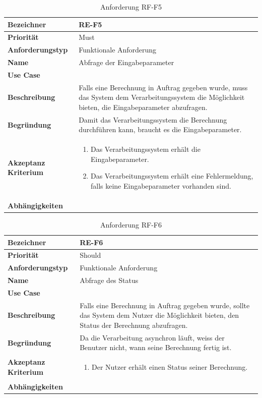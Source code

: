 \begin{table}[ht]
\centering
  \begin{tabular}{ l | p{8cm} }
	\hline
	\rowcolor{gray}
	\textbf{Bezeichner}&	\textbf{RE-F5}\\ \hline
	\textbf{Priorität} 		&	Must\\ \hline
	\textbf{Anforderungstyp}	&	Funktionale Anforderung\\ \hline
	\textbf{Name} 			&	Abfrage der Eingabeparameter\\ \hline
	\textbf{Use Case} 		&	\nameref{table:use_case_3}\\ \hline
	\textbf{Beschreibung} 	&	Falls eine Berechnung in Auftrag gegeben wurde, muss das System dem Verarbeitungssystem die Möglichkeit bieten, die Eingabeparameter abzufragen.\\ \hline
	\textbf{Begründung}		&	Damit das Verarbeitungssystem die Berechnung durchführen kann, braucht es die Eingabeparameter.\\ \hline
	\textbf{Akzeptanz Kriterium}	&	\begin{enumerate}
					\item Das Verarbeitungssystem erhält die Eingabeparameter.
					\item Das Verarbeitungssystem erhält eine Fehlermeldung, falls keine Eingabeparameter vorhanden sind.
					\end{enumerate}
					\\ \hline
	\textbf{Abhängigkeiten} 	&	\nameref{table:req_3}\\ \hline
  \end{tabular}
   \caption{Anforderung RF-F5}\label{table:req_5}
\end{table}

\begin{table}[ht]
\centering
  \begin{tabular}{ l | p{8cm} }
	\hline
	\rowcolor{gray}
	\textbf{Bezeichner}&	\textbf{RE-F6}\\ \hline
	\textbf{Priorität} 		&	Should\\ \hline
	\textbf{Anforderungstyp}	&	Funktionale Anforderung\\ \hline
	\textbf{Name} 			&	Abfrage des Status\\ \hline
	\textbf{Use Case} 		&	\nameref{table:use_case_4}\\ \hline
	\textbf{Beschreibung} 	&	Falls eine Berechnung in Auftrag gegeben wurde, sollte das System dem Nutzer die Möglichkeit bieten, den Status der Berechnung abzufragen.\\ \hline
	\textbf{Begründung} 		&	Da die Verarbeitung asynchron läuft, weiss der Benutzer nicht, wann seine Berechnung fertig ist.\\ \hline
	\textbf{Akzeptanz Kriterium}	&	\begin{enumerate}
					\item Der Nutzer erhält einen Status seiner Berechnung.
					\end{enumerate}
					\\ \hline
	\textbf{Abhängigkeiten} 	&	\nameref{table:req_2}\\ \hline
  \end{tabular}
   \caption{Anforderung RF-F6}\label{table:req_6}
\end{table}

